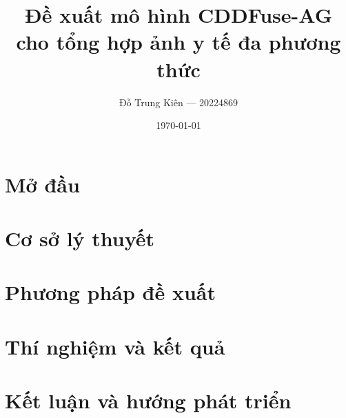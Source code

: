 \documentclass[12pt,a4paper,oneside]{report}
\title{\textbf{Đề xuất mô hình CDDFuse-AG cho tổng hợp ảnh y tế đa phương thức}}
\author{Đỗ Trung Kiên --- 20224869}
\date{\today}
\begin{document}





\tableofcontents
\listoftables
\listoffigures

\chapter{Mở đầu}\label{ch:intro}


\chapter{Cơ sở lý thuyết}\label{ch:background}


\chapter{Phương pháp đề xuất}\label{ch:method}


\chapter{Thí nghiệm và kết quả}\label{ch:results}


\chapter{Kết luận và hướng phát triển}\label{ch:conclusion}




\end{document}
